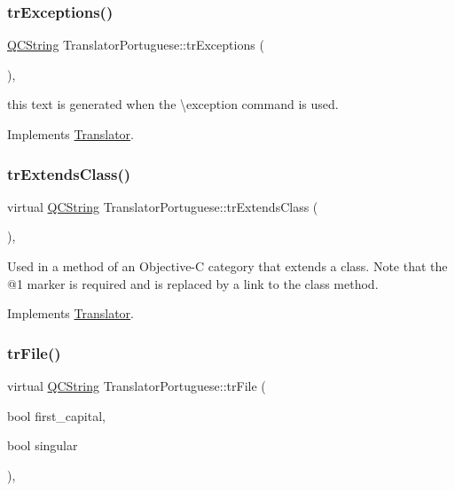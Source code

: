 \subsubsection{\texorpdfstring{trExceptions()}{trExceptions()}}
{\footnotesize\ttfamily \mbox{\hyperlink{class_q_c_string}{Q\+C\+String}} Translator\+Portuguese\+::tr\+Exceptions (\begin{DoxyParamCaption}{ }\end{DoxyParamCaption})\hspace{0.3cm}{\ttfamily [inline]}, {\ttfamily [virtual]}}

this text is generated when the \textbackslash{}exception command is used. 

Implements \mbox{\hyperlink{class_translator}{Translator}}.

\mbox{\label{class_translator_portuguese_a96ea3065b37d2745866d70b83a4067b6}} 
\subsubsection{\texorpdfstring{trExtendsClass()}{trExtendsClass()}}
{\footnotesize\ttfamily virtual \mbox{\hyperlink{class_q_c_string}{Q\+C\+String}} Translator\+Portuguese\+::tr\+Extends\+Class (\begin{DoxyParamCaption}{ }\end{DoxyParamCaption})\hspace{0.3cm}{\ttfamily [inline]}, {\ttfamily [virtual]}}

Used in a method of an Objective-\/C category that extends a class. Note that the @1 marker is required and is replaced by a link to the class method. 

Implements \mbox{\hyperlink{class_translator}{Translator}}.

\mbox{\label{class_translator_portuguese_acc79ac16678f5536de5757e5e94b1c88}} 
\subsubsection{\texorpdfstring{trFile()}{trFile()}}
{\footnotesize\ttfamily virtual \mbox{\hyperlink{class_q_c_string}{Q\+C\+String}} Translator\+Portuguese\+::tr\+File (\begin{DoxyParamCaption}\item[{bool}]{first\+\_\+capital,  }\item[{bool}]{singular }\end{DoxyParamCaption})\hspace{0.3cm}{\ttfamily [inline]}, {\ttfamily [virtual]}}

